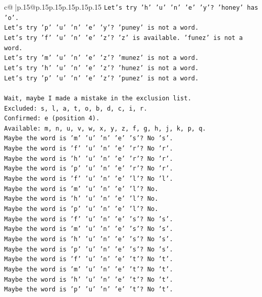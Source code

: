 \documentclass{article}
\begin{document}
{\begin{supertabular}{c@{$\;$}|p{.15\linewidth}@{}p{.15\linewidth}p{.15\linewidth}p{.15\linewidth}p{.15\linewidth}p{.15\linewidth}}
{{{\texttt{Let's try 'h' 'u' 'n' 'e' 'y'? 'honey' has 'o'.} \\
\texttt{Let's try 'p' 'u' 'n' 'e' 'y'? 'puney' is not a word.} \\
\texttt{Let's try 'f' 'u' 'n' 'e' 'z'? 'z' is available. 'funez' is not a word.} \\
\texttt{Let's try 'm' 'u' 'n' 'e' 'z'? 'munez' is not a word.} \\
\texttt{Let's try 'h' 'u' 'n' 'e' 'z'? 'hunez' is not a word.} \\
\texttt{Let's try 'p' 'u' 'n' 'e' 'z'? 'punez' is not a word.} \\
\\ 
\texttt{Wait, maybe I made a mistake in the exclusion list.} \\
\texttt{Excluded: s, l, a, t, o, b, d, c, i, r.} \\
\texttt{Confirmed: e (position 4).} \\
\texttt{Available: m, n, u, v, w, x, y, z, f, g, h, j, k, p, q.} \\
\texttt{Maybe the word is 'm' 'u' 'n' 'e' 's'? No 's'.} \\
\texttt{Maybe the word is 'f' 'u' 'n' 'e' 'r'? No 'r'.} \\
\texttt{Maybe the word is 'h' 'u' 'n' 'e' 'r'? No 'r'.} \\
\texttt{Maybe the word is 'p' 'u' 'n' 'e' 'r'? No 'r'.} \\
\texttt{Maybe the word is 'f' 'u' 'n' 'e' 'l'? No 'l'.} \\
\texttt{Maybe the word is 'm' 'u' 'n' 'e' 'l'? No.} \\
\texttt{Maybe the word is 'h' 'u' 'n' 'e' 'l'? No.} \\
\texttt{Maybe the word is 'p' 'u' 'n' 'e' 'l'? No.} \\
\texttt{Maybe the word is 'f' 'u' 'n' 'e' 's'? No 's'.} \\
\texttt{Maybe the word is 'm' 'u' 'n' 'e' 's'? No 's'.} \\
\texttt{Maybe the word is 'h' 'u' 'n' 'e' 's'? No 's'.} \\
\texttt{Maybe the word is 'p' 'u' 'n' 'e' 's'? No 's'.} \\
\texttt{Maybe the word is 'f' 'u' 'n' 'e' 't'? No 't'.} \\
\texttt{Maybe the word is 'm' 'u' 'n' 'e' 't'? No 't'.} \\
\texttt{Maybe the word is 'h' 'u' 'n' 'e' 't'? No 't'.} \\
\texttt{Maybe the word is 'p' 'u' 'n' 'e' 't'? No 't'.} \\
}}}
\end{supertabular}}
\end{document}
